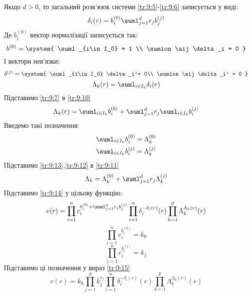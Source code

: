 Якщо $d>0$, то загальний розв’язок системи \eqref{tr:9:5}-\eqref{tr:9:6} записується у виді:
\begin{equation}\label{tr:9:7}
\delta_i (r) = b_i^{(0)} \suml_{j=1}^d r_j b_j^{(j)} 
\end{equation}
Де $b_i^{(0)}$ вектор нормалізації записується так:
\begin{equation}\label{tr:9:8}
b^{(0)}  = \system{
\suml_{i\in I_0} = 1 \\
\sumion \aij \delta_i = 0
}
\end{equation}\label{tr:9:9}
І вектори нев’язки:
\begin{equation}
b^{(j)} = \system{
\suml_{i\in I_0} \delta_i'= 0\\
\sumion \aij \delta_i' = 0
}
\end{equation}
\begin{equation}\label{tr:9:10}
\Lambda_k (r) = \suml_{i\in I_k} \delta_i(r) 
\end{equation}
Підставимо \eqref{tr:9:7} в \eqref{tr:9:10}
\begin{equation}\label{tr:9:11}
\Lambda_k(r) = \suml_{i\in I_k} b_i^{(0)} + \suml_{j=1}^d r_j \suml_{i\in I_k} b_i^{(j)}
\end{equation}
Введемо такі позначення:
\begin{eqnarray}
&\suml_{i\in I_k} b_i^{(0)} = \Lambda_k^{(0)} \label{tr:9:12}\\
&\suml_{i\in I_k} b_i^{(j)} = \Lambda_k^{(j)} \label{tr:9:13}
\end{eqnarray}
Підставимо \eqref{tr:9:13},\eqref{tr:9:12} в \eqref{tr:9:11}
\begin{equation}\label{tr:9:14}
\Lambda_k = \Lambda_k^{(0)} + \suml_{j=1}^d r_j \Lambda_k^{(j)}
\end{equation}
Підставимо \eqref{tr:9:14} у цільову функцію:
\begin{equation}\label{tr:9:15}
v(r) = \prod\limits_{i=1}^n c_i^{ b_i^{(0)} + \suml_{j=1}^d r_j b_j^{(j)} } \prod\limits_{i=1}^n \delta_i^{-\delta_i(r)}(r) \prod_{k=1}^p \Lambda_k^{\Lambda_k(r)} (r)
\end{equation}
\begin{equation}
\prod\limits_{i=1}^n c_i^{b_i^{(0)}} = k_0
\end{equation}
\begin{equation}
\prod\limits_{i=1}^n c_i^{b_i^{(j)}} = k_j
\end{equation}
Підставимо ці позначення у вираз \eqref{tr:9:15}
\begin{equation}
v(r) = k_0\prod\limits_{j=1}^d k_j^{r_j}  \prod\limits_{i=1}^n \delta_i^{-\delta_i(r)}(r) \prod_{k=1}^p \Lambda_k^{\Lambda_k(r)} (r)
\end{equation}
